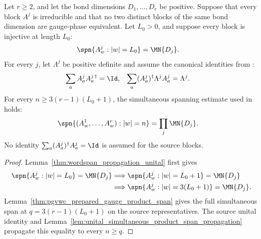 \begin{lemma}
    \label{thm:pgvwc_product_span_source_length}
    \leanok
    Let $r\ge2$, and let the bond dimensions $D_1,\ldots,D_r$ be positive.
    Suppose that every block $A^j$ is irreducible and that no two distinct
    blocks of the same bond dimension are gauge-phase equivalent. Let $L_0>0$,
    and suppose every block is injective at length $L_0$:
    \begin{align}
        \spn\{A^j_w:|w|=L_0\} & =\MN{D_j}. \notag
    \end{align}
    For every $j$, let $\Lambda^j$ be positive definite and assume the canonical
    identities from \cite{PerezGarcia2007Matrix}:
    \begin{align}
        \sum_aA^j_aA^{j\,\dagger}_a & =\Id,
                                    & \sum_a(A^j_a)^\dagger\Lambda^jA^j_a & =\Lambda^j. \notag
    \end{align}
    For every $n\ge 3(r-1)(L_0+1)$, the simultaneous spanning estimate used in
    \cite[Theorem~12, proof lines~1424--1456]{PerezGarcia2007Matrix} holds:
    \begin{align}
        \spn\{(A^1_w,\ldots,A^r_w):|w|=n\} & =\prod_j\MN{D_j}. \notag
    \end{align}
    No identity $\sum_a(A^j_a)^\dagger A^j_a=\Id$ is assumed for the source
    blocks.
\end{lemma}

\begin{proof}
    \leanok
    Lemma~\ref{thm:wordspan_propagation_unital} first gives
    \begin{align}
        \spn\{A^j_w:|w|=L_0\}=\MN{D_j}
         & \Longrightarrow
        \spn\{A^j_w:|w|=L_0+1\}=\MN{D_j}
        \notag             \\
         & \Longrightarrow
        \spn\{A^j_w:|w|=3(L_0+1)\}=\MN{D_j}. \notag
    \end{align}
    Lemma~\ref{thm:pgvwc_prepared_gauge_product_span} gives the full
    simultaneous span at $q=3(r-1)(L_0+1)$ on the source representatives.
    The source unital identity and
    Lemma~\ref{lem:unital_simultaneous_product_span_propagation} propagate
    this equality to every $n\ge q$.
\end{proof}

